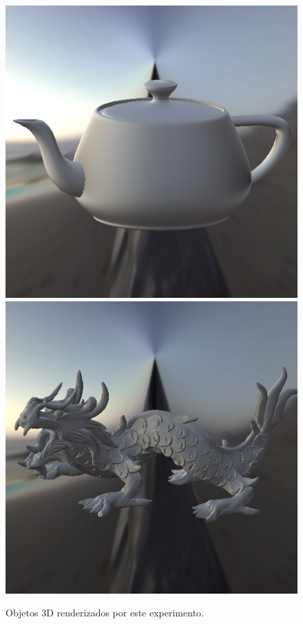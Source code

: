 \begin{figure}[H]
    \caption{\small{Objetos 3D renderizados por este experimento.}}
    \label{fig-kajiya-objects}
  \includegraphics[width=\linewidth]{./Imagens/brdfs/aniso-teapot.png}
\endminipage\hfill
{}
  \includegraphics[width=\linewidth]{./Imagens/brdfs/aniso-dragon.png}

\end{figure}
